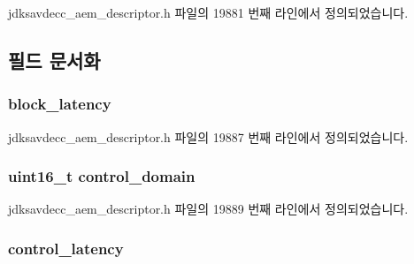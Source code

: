 jdksavdecc\+\_\+aem\+\_\+descriptor.\+h 파일의 19881 번째 라인에서 정의되었습니다.



\subsection{필드 문서화}
\subsubsection[{\texorpdfstring{block\+\_\+latency}{block_latency}}]{ block\+\_\+latency}\hypertarget{structjdksavdecc__descriptor__mixer_ae2e9f0088d5e900b610d1b2818dfc559}{}\label{structjdksavdecc__descriptor__mixer_ae2e9f0088d5e900b610d1b2818dfc559}


jdksavdecc\+\_\+aem\+\_\+descriptor.\+h 파일의 19887 번째 라인에서 정의되었습니다.

\subsubsection[{\texorpdfstring{control\+\_\+domain}{control_domain}}]{\setlength{\rightskip}{0pt plus 5cm}uint16\+\_\+t control\+\_\+domain}\hypertarget{structjdksavdecc__descriptor__mixer_a8937b22996b7c28ae209f29fe777f03a}{}\label{structjdksavdecc__descriptor__mixer_a8937b22996b7c28ae209f29fe777f03a}


jdksavdecc\+\_\+aem\+\_\+descriptor.\+h 파일의 19889 번째 라인에서 정의되었습니다.

\subsubsection[{\texorpdfstring{control\+\_\+latency}{control_latency}}]{ control\+\_\+latency}\hypertarget{structjdksavdecc__descriptor__mixer_ab2bd4639caaf9a8078b68368afbd63b6}{}\label{structjdksavdecc__descriptor__mixer_ab2bd4639caaf9a8078b68368afbd63b6}


